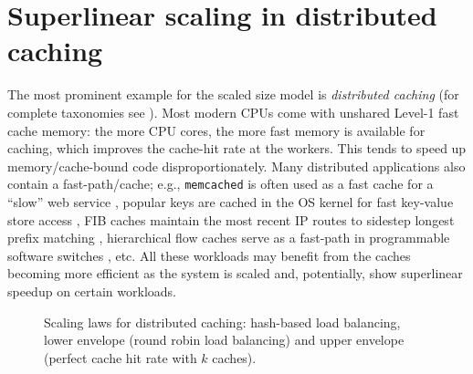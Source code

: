 \section{Superlinear scaling in distributed caching}\label{sec:dist-caching}

The most prominent example for the scaled size model is \emph{distributed caching} \cite{scalability-analyzed, sdn-analytitcs, dobb-2} (for complete taxonomies see \cite{556383, 7733347, 80148}).  Most modern CPUs come with unshared Level-1 fast cache memory: the more CPU cores, the more fast memory is available for caching, which improves the cache-hit rate at the workers. This tends to speed up memory\slash cache-bound code disproportionately. Many distributed applications also contain a fast-path\slash cache; e.g., \texttt{memcached} is often used as a fast cache for a ``slow'' web service \cite{180324,10.5555/1012889.1012894}, popular keys are cached in the OS kernel for fast key-value store access \cite{179747, ghigoff2021bmc}, FIB caches maintain the most recent IP routes to sidestep longest prefix matching \cite{rottenstreich2016optimal}, hierarchical flow caches serve as a fast-path in programmable software switches \cite{188960}, etc. All these workloads may benefit from the caches becoming more efficient as the system is scaled and, potentially, show superlinear speedup on certain workloads. %

\begin{figure}
  \centering
  \begin{small}
    
\end{small}
\caption{Scaling laws for distributed caching: hash-based load balancing, lower envelope (round robin load balancing) and upper envelope (perfect cache hit rate with $k$ caches). }
  \label{fig:dcache-analysis}
\end{figure}



